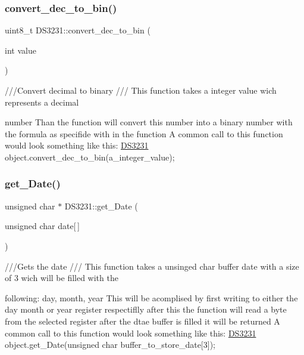 \subsubsection{\texorpdfstring{convert\+\_\+dec\+\_\+to\+\_\+bin()}{convert\_dec\_to\_bin()}}
{\footnotesize\ttfamily uint8\+\_\+t D\+S3231\+::convert\+\_\+dec\+\_\+to\+\_\+bin (\begin{DoxyParamCaption}\item[{int}]{value }\end{DoxyParamCaption})}



///\+Convert decimal to binary  /// This function takes a integer value wich represents a decimal 

number Than the function will convert this number into a binary number with the formula as specifide with in the function A common call to this function would look something like this\+: \hyperlink{classDS3231}{D\+S3231} object.\+convert\+\_\+dec\+\_\+to\+\_\+bin(a\+\_\+integer\+\_\+value); \mbox{\label{classDS3231_a3f239b6d1a7caea0d5968e96d4d01c33}} 
\subsubsection{\texorpdfstring{get\+\_\+\+Date()}{get\_Date()}}
{\footnotesize\ttfamily unsigned char $\ast$ D\+S3231\+::get\+\_\+\+Date (\begin{DoxyParamCaption}\item[{unsigned char}]{date\mbox{[}$\,$\mbox{]} }\end{DoxyParamCaption})}



///\+Gets the date  /// This function takes a unsinged char buffer date with a size of 3 wich will be filled with the 

following\+: day, month, year This will be acomplised by first writing to either the day month or year register respectiflly after this the function will read a byte from the selected register after the dtae buffer is filled it will be returned A common call to this function would look something like this\+: \hyperlink{classDS3231}{D\+S3231} object.\+get\+\_\+\+Date(unsigned char buffer\+\_\+to\+\_\+store\+\_\+date\mbox{[}3\mbox{]}); \mbox{\label{classDS3231_a2fd39852689c72e04cc2ad67371976c1}} 
